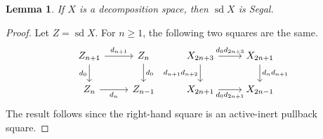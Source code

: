 \documentclass{amsart}
\newtheorem{lemma}[theorem]{Lemma}
\theoremstyle{definition}
\theoremstyle{remark}
\DeclareMathOperator{\sd}{sd}
\begin{document}
\begin{lemma}\label{lem decomp implies sd Segal}
If $X$ is a decomposition space, then $\sd X$ is Segal.
\end{lemma}
\begin{proof}
Let $Z = \sd X$.
For $n\geq 1$, the following two squares are the same.
\[ \begin{tikzcd}
Z_{n+1} \rar{d_{n+1}} \dar[swap]{d_0}  & Z_n \dar{d_0} 
&  
X_{2n+3} \rar{d_0d_{2n+3}} \dar[swap]{d_{n+1}d_{n+2}}  & X_{2n+1} \dar{d_n d_{n+1}}
\\
Z_n \rar[swap]{d_n} & Z_{n-1}
&  
X_{2n+1} \rar[swap]{d_0d_{2n+1}} & X_{2n-1}
\end{tikzcd} \]
The result follows since the right-hand square is an active-inert pullback square.
\end{proof}
\end{document}
